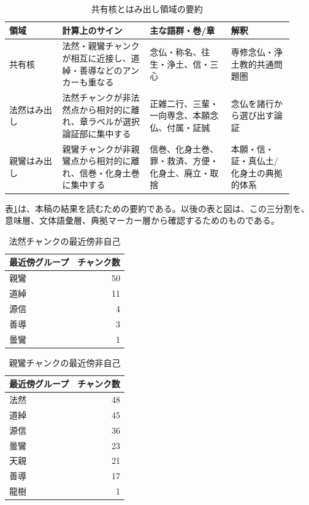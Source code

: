 \documentclass[uplatex,dvipdfmx,11pt,a4paper]{jsarticle}
\begin{document}
\begin{table}[H]
\centering
\small
\caption{共有核とはみ出し領域の要約}
\label{tab:shared-protrusion-summary}
\begin{tabular}{@{}p{0.17\linewidth}p{0.29\linewidth}p{0.26\linewidth}p{0.20\linewidth}@{}}
\toprule
領域 & 計算上のサイン & 主な語群・巻/章 & 解釈 \\
\midrule
共有核 & 法然・親鸞チャンクが相互に近接し、道綽・善導などのアンカーも重なる & 念仏・称名、往生・浄土、信・三心 & 専修念仏・浄土教的共通問題圏 \\
法然はみ出し & 法然チャンクが非法然点から相対的に離れ、章ラベルが選択論証部に集中する & 正雑二行、三輩・一向専念、本願念仏、付属・証誠 & 念仏を諸行から選び出す論証 \\
親鸞はみ出し & 親鸞チャンクが非親鸞点から相対的に離れ、信巻・化身土巻に集中する & 信巻、化身土巻、罪・救済、方便・化身土、廃立・取捨 & 本願・信・証・真仏土/化身土の典拠的体系 \\
\bottomrule
\end{tabular}
\end{table}

表\ref{tab:shared-protrusion-summary}は、本稿の結果を読むための要約である。以後の表と図は、この三分割を、意味層、文体語彙層、典拠マーカー層から確認するためのものである。

\begin{table}[H]
\centering
\small
\caption{法然チャンクの最近傍非自己}
\label{tab:honen-nearest}
\begin{tabular}{@{}lr@{}}
\toprule
最近傍グループ & チャンク数 \\
\midrule
親鸞 & 50 \\
道綽 & 11 \\
源信 & 4 \\
善導 & 3 \\
曇鸞 & 1 \\
\bottomrule
\end{tabular}
\end{table}

\begin{table}[H]
\centering
\small
\caption{親鸞チャンクの最近傍非自己}
\label{tab:shinran-nearest}
\begin{tabular}{@{}lr@{}}
\toprule
最近傍グループ & チャンク数 \\
\midrule
法然 & 48 \\
道綽 & 45 \\
源信 & 36 \\
曇鸞 & 23 \\
天親 & 21 \\
善導 & 17 \\
龍樹 & 1 \\
\bottomrule
\end{tabular}
\end{table}
\end{document}
